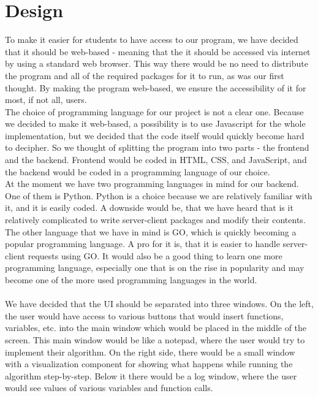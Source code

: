 \documentclass[11pt]{article}
\begin{document}
\section{Design}
To make it easier for students to have access to our program, we have decided that it should be web-based - meaning that the it should be accessed via internet by using a standard web browser. This way there would be no need to distribute the program and all of the required packages for it to run, as was our first thought. By making the program web-based, we ensure the accessibility of it for most, if not all, users.\\
The choice of programming language for our project is not a clear one. Because we decided to make it web-based, a possibility is to use Javascript for the whole implementation, but we decided that the code itself would quickly become hard to decipher. So we thought of splitting the program into two parts - the frontend and the backend. Frontend would be coded in HTML, CSS, and JavaScript, and the backend would be coded in a programming language of our choice.\\
At the moment we have two programming languages in mind for our backend. One of them is Python. Python is a choice because we are relatively familiar with it, and it is easily coded. A downside would be, that we have heard that is it relatively complicated to write server-client packages and modify their contents.\\
The other language that we have in mind is GO, which is quickly becoming a popular programming language. A pro for it is, that it is easier to handle server-client requests using GO. It would also be a good thing to learn one more programming language, especially one that is on the rise in popularity and may become one of the more used programming languages in the world.\\\\
We have decided that the UI should be separated into three windows. On the left, the user would have access to various buttons that would insert functions, variables, etc. into the main window which would be placed in the middle of the screen. This main window would be like a notepad, where the user would try to implement their algorithm. On the right side, there would be a small window with a visualization component for showing what happens while running the algorithm step-by-step. Below it there would be a log window, where the user would see values of various variables and function calls.\\\\
\end{document}
